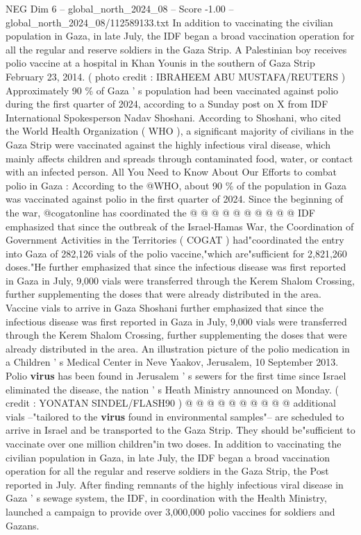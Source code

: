 \begin{textsample}{NEG Dim 6 – global\_north\_2024\_08 – Score -1.00 – global\_north\_2024\_08/112589133.txt}  \label{ex:f6_neg_159}
In addition to vaccinating the civilian population in Gaza, in late July, the IDF began a broad vaccination operation for all the regular and reserve soldiers in the Gaza Strip.
A Palestinian boy receives polio vaccine at a hospital in Khan Younis in the southern of Gaza Strip February 23, 2014. ( photo credit : IBRAHEEM ABU MUSTAFA/REUTERS ) Approximately 90 \% of Gaza ' s population had been vaccinated against polio during the first quarter of 2024, according to a Sunday post on X from IDF International Spokesperson Nadav Shoshani.
According to Shoshani, who cited the World Health Organization ( WHO ), a significant majority of civilians in the Gaza Strip were vaccinated against the highly infectious viral disease, which mainly affects children and spreads through contaminated food, water, or contact with an infected person.
All You Need to Know About Our Efforts to combat polio in Gaza : According to the @WHO, about 90 \% of the population in Gaza was vaccinated against polio in the first quarter of 2024.
Since the beginning of the war, @cogatonline has coordinated the @ @ @ @ @ @ @ @ @ @ IDF emphasized that since the outbreak of the Israel-Hamas War, the Coordination of Government Activities in the Territories ( COGAT ) had"coordinated the entry into Gaza of 282,126 vials of the polio vaccine,"which are"sufficient for 2,821,260 doses."He further emphasized that since the infectious disease was first reported in Gaza in July, 9,000 vials were transferred through the Kerem Shalom Crossing, further supplementing the doses that were already distributed in the area.
Vaccine vials to arrive in Gaza Shoshani further emphasized that since the infectious disease was first reported in Gaza in July, 9,000 vials were transferred through the Kerem Shalom Crossing, further supplementing the doses that were already distributed in the area.
An illustration picture of the polio medication in a Children ' s Medical Center in Neve Yaakov, Jerusalem, 10 September 2013.
Polio \textbf{virus} has been found in Jerusalem ' s sewers for the first time since Israel eliminated the disease, the nation ' s Heath Ministry announced on Monday. ( credit : YONATAN SINDEL/FLASH90 ) @ @ @ @ @ @ @ @ @ @ additional vials --"tailored to the \textbf{virus} found in environmental samples"-- are scheduled to arrive in Israel and be transported to the Gaza Strip.
They should be"sufficient to vaccinate over one million children"in two doses.
In addition to vaccinating the civilian population in Gaza, in late July, the IDF began a broad vaccination operation for all the regular and reserve soldiers in the Gaza Strip, the Post reported in July.
After finding remnants of the highly infectious viral disease in Gaza ' s sewage system, the IDF, in coordination with the Health Ministry, launched a campaign to provide over 3,000,000 polio vaccines for soldiers and Gazans.

\end{textsample}
